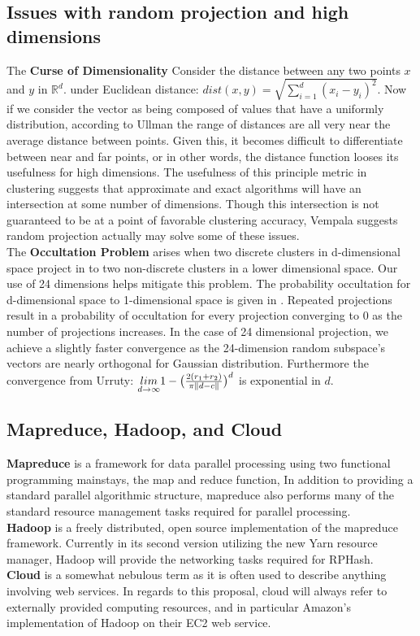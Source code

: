 \documentclass[a4paper,10pt]{article}
\begin{document}
\subsection{Issues with random projection and high dimensions}
The \textbf{Curse of Dimensionality} 
Consider the distance between any two points
$x$ and $y$ in $\mathbb{R}^d$. under Euclidean distance: $dist(x,y)
=\sqrt{\sum^{d}_{i=1}{(x_i-y_i)^{2}}}$.  Now if we consider the vector as being
composed of values that have a uniformly distribution, according to Ullman
\cite{Ullman} the range of distances are all very near the average distance
between points.  Given this, it becomes difficult to differentiate between
near and far points, or in other words, the distance function looses its usefulness
for high dimensions\cite{Beyer}. 
The usefulness of this principle metric in clustering suggests
that approximate and exact algorithms will have an intersection at some number of dimensions.
Though this intersection is not guaranteed to be at a point of favorable clustering accuracy,
Vempala suggests random projection actually may solve some of these issues\cite{Vempala}\cite{bingham}.\\
The \textbf{Occultation Problem} arises when two 
discrete clusters in d-dimensional space project in to
two non-discrete clusters in a lower dimensional space. 
Our use of 24 dimensions helps mitigate this problem. 
The probability 
occultation for d-dimensional space to 1-dimensional space is given in 
\cite{Urruty2007}. Repeated projections result in a probability of occultation for
every projection converging to 0 as the number of projections increases. In the
case of 24 dimensional projection, we achieve a slightly faster convergence
 as the 24-dimension random subspace's vectors are nearly 
orthogonal for Gaussian distribution\cite{Vempala}. Furthermore 
the convergence from Urruty: $\underset {d\rightarrow \infty}{lim}1-\big({{2(r_1+r_2)}\over {\pi \|d-c\|}}\big)^d$
is exponential in $d$.


\subsection{Mapreduce, Hadoop, and Cloud}
\textbf{Mapreduce} is a framework for data parallel processing using two functional programming mainstays, the map and reduce
function, In addition to providing a standard parallel algorithmic structure, mapreduce also performs many of the standard
resource management tasks required for parallel processing. \\
\textbf{Hadoop} is a freely distributed, open source implementation of the mapreduce framework. Currently in its second version
utilizing the new Yarn resource manager, Hadoop will provide the networking tasks required for RPHash.\\
\textbf{Cloud} is a somewhat nebulous term as it is often used to describe anything involving web services. In regards to this
proposal, cloud will always refer to externally provided computing resources, and in particular Amazon's implementation of
Hadoop on their EC2 web service.
\end{document}
